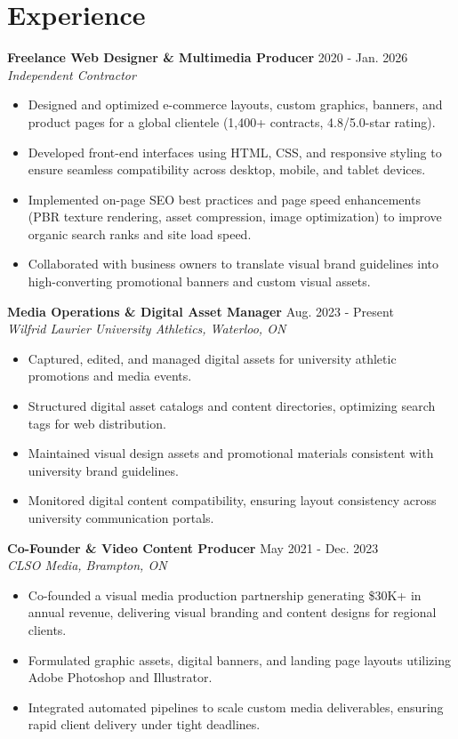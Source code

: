 \documentclass[a4paper,10pt]{article}
\begin{document}
\section*{Experience}
\textbf{Freelance Web Designer \& Multimedia Producer} \hfill 2020 - Jan. 2026 \\
\textit{Independent Contractor}
\begin{itemize}
    \item Designed and optimized e-commerce layouts, custom graphics, banners, and product pages for a global clientele (1,400+ contracts, 4.8/5.0-star rating).
    \item Developed front-end interfaces using HTML, CSS, and responsive styling to ensure seamless compatibility across desktop, mobile, and tablet devices.
    \item Implemented on-page SEO best practices and page speed enhancements (PBR texture rendering, asset compression, image optimization) to improve organic search ranks and site load speed.
    \item Collaborated with business owners to translate visual brand guidelines into high-converting promotional banners and custom visual assets.
\end{itemize}

\vspace{3pt}
\textbf{Media Operations \& Digital Asset Manager} \hfill Aug. 2023 - Present \\
\textit{Wilfrid Laurier University Athletics, Waterloo, ON}
\begin{itemize}
    \item Captured, edited, and managed digital assets for university athletic promotions and media events.
    \item Structured digital asset catalogs and content directories, optimizing search tags for web distribution.
    \item Maintained visual design assets and promotional materials consistent with university brand guidelines.
    \item Monitored digital content compatibility, ensuring layout consistency across university communication portals.
\end{itemize}

\vspace{3pt}
\textbf{Co-Founder \& Video Content Producer} \hfill May 2021 - Dec. 2023 \\
\textit{CLSO Media, Brampton, ON}
\begin{itemize}
    \item Co-founded a visual media production partnership generating \$30K+ in annual revenue, delivering visual branding and content designs for regional clients.
    \item Formulated graphic assets, digital banners, and landing page layouts utilizing Adobe Photoshop and Illustrator.
    \item Integrated automated pipelines to scale custom media deliverables, ensuring rapid client delivery under tight deadlines.
\end{itemize}
\end{document}
